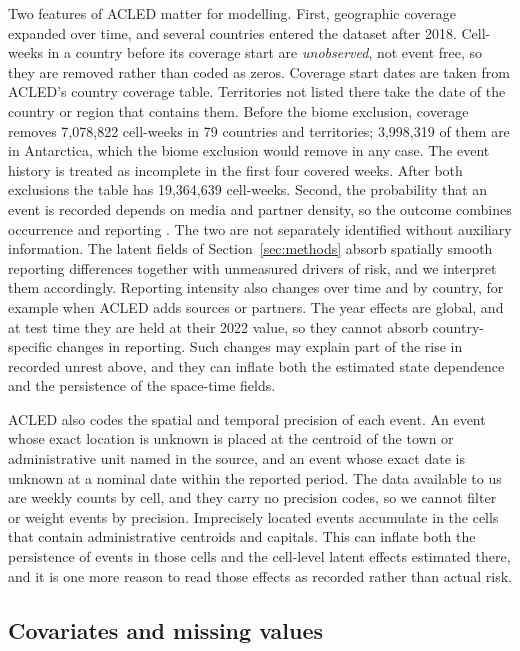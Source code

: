 Two features of ACLED matter for modelling. First, geographic coverage expanded over
time, and several countries entered the dataset after 2018. Cell-weeks in a country
before its coverage start are \emph{unobserved}, not event free, so they are removed
rather than coded as zeros. Coverage start dates are taken from ACLED's country
coverage table. Territories not listed there take the date of the country or region
that contains them. Before the biome exclusion, coverage removes 7{,}078{,}822
cell-weeks in 79 countries and territories; 3{,}998{,}319 of them are in Antarctica,
which the biome exclusion would remove in any case. The event history is treated as
incomplete in the first four covered weeks. After both exclusions the table has
19{,}364{,}639 cell-weeks.
Second, the probability that an event is recorded depends on media and partner
density, so the outcome combines occurrence and reporting
\citep{weidmann2016closer}. The two are not separately identified
without auxiliary information. The latent fields of Section~\ref{sec:methods}
absorb spatially smooth reporting differences together with unmeasured drivers of
risk, and we interpret them accordingly. Reporting intensity also changes over time
and by country, for example when ACLED adds sources or partners. The year effects are
global, and at test time they are held at their 2022 value, so they cannot absorb
country-specific changes in reporting. Such changes may explain part of the rise in
recorded unrest above, and they can inflate both the estimated state dependence and
the persistence of the space-time fields.

ACLED also codes the spatial and temporal precision of each event. An event whose
exact location is unknown is placed at the centroid of the town or administrative
unit named in the source, and an event whose exact date is unknown at a nominal date
within the reported period. The data available to us are weekly counts by cell, and
they carry no precision codes, so we cannot filter or weight events by precision.
Imprecisely located events accumulate in the cells that contain administrative
centroids and capitals. This can inflate both the persistence of events in those
cells and the cell-level latent effects estimated there, and it is one more reason
to read those effects as recorded rather than actual risk.

\subsection{Covariates and missing values}\label{supp:data-cov}

